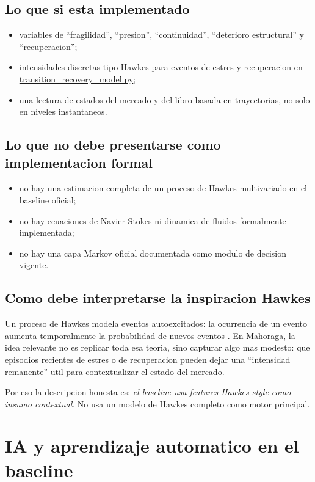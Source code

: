 \documentclass[11pt,letterpaper]{article}
\newcommand{\code}[1]{{\urlstyle{tt}\url{#1}}}
\begin{document}
\subsection{Lo que si esta implementado}
\begin{itemize}
    \item variables de \enquote{fragilidad}, \enquote{presion}, \enquote{continuidad}, \enquote{deterioro estructural} y \enquote{recuperacion};
    \item intensidades discretas tipo Hawkes para eventos de estres y recuperacion en \code{transition\_recovery\_model.py};
    \item una lectura de estados del mercado y del libro basada en trayectorias, no solo en niveles instantaneos.
\end{itemize}

\subsection{Lo que no debe presentarse como implementacion formal}
\begin{itemize}
    \item no hay una estimacion completa de un proceso de Hawkes multivariado en el baseline oficial;
    \item no hay ecuaciones de Navier-Stokes ni dinamica de fluidos formalmente implementada;
    \item no hay una capa Markov oficial documentada como modulo de decision vigente.
\end{itemize}

\subsection{Como debe interpretarse la inspiracion Hawkes}
Un proceso de Hawkes modela eventos autoexcitados: la ocurrencia de un evento aumenta temporalmente la probabilidad de nuevos eventos \citep{hawkes1971}. En Mahoraga, la idea relevante no es replicar toda esa teoria, sino capturar algo mas modesto: que episodios recientes de estres o de recuperacion pueden dejar una \enquote{intensidad remanente} util para contextualizar el estado del mercado.

Por eso la descripcion honesta es: \emph{el baseline usa features Hawkes-style como insumo contextual}. No usa un modelo de Hawkes completo como motor principal.

\section{IA y aprendizaje automatico en el baseline}
\end{document}
